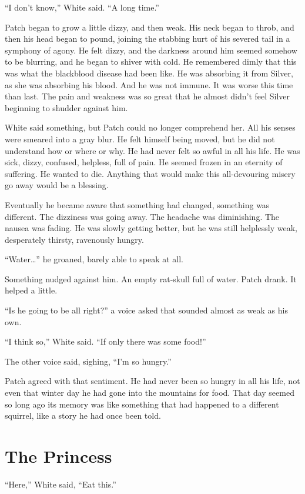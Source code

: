 \documentclass[12pt]{memoir}
\begin{document}
“I don’t know,” White said. “A long time.”

Patch began to grow a little dizzy, and then weak. His neck began to
throb, and then his head began to pound, joining the stabbing hurt of
his severed tail in a symphony of agony. He felt dizzy, and the
darkness around him seemed somehow to be blurring, and he began to
shiver with cold. He remembered dimly that this was what the
blackblood disease had been like. He was absorbing it from Silver, as
she was absorbing his blood. And he was not immune. It was worse this
time than last. The pain and weakness was so great that he almost
didn’t feel Silver beginning to shudder against him.

White said something, but Patch could no longer comprehend her. All
his senses were smeared into a gray blur. He felt himself being moved,
but he did not understand how or where or why. He had never felt so
awful in all his life. He was sick, dizzy, confused, helpless, full of
pain. He seemed frozen in an eternity of suffering. He wanted to
die. Anything that would make this all-devouring misery go away would
be a blessing.

Eventually he became aware that something had changed, something was
different. The dizziness was going away. The headache was
diminishing. The nausea was fading. He was slowly getting better, but
he was still helplessly weak, desperately thirsty, ravenously hungry.

“Water…” he groaned, barely able to speak at all.

Something nudged against him. An empty rat-skull full of water. Patch
drank. It helped a little.

“Is he going to be all right?” a voice asked that sounded almost as
weak as his own.

“I think so,” White said. “If only there was some food!”

The other voice said, sighing, “I’m so hungry.”

Patch agreed with that sentiment. He had never been so hungry in all
his life, not even that winter day he had gone into the mountains for
food. That day seemed so long ago its memory was like something that
had happened to a different squirrel, like a story he had once been
told.


\section{The Princess}

“Here,” White said, “Eat this.”
\end{document}
